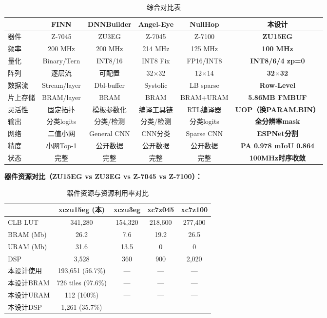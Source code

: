 \documentclass[11pt,a4paper]{article}
\begin{document}
\begin{table}[h]
\centering
\caption{综合对比表}
\small
\begin{tabular}{@{}lccccc@{}}
\toprule
 & FINN & DNNBuilder & Angel-Eye & NullHop & \textbf{本设计} \\
\midrule
器件 & Z-7045 & ZU3EG & Z-7045 & Z-7100 & \textbf{ZU15EG} \\
频率 & 200 MHz & 200 MHz & 214 MHz & 125 MHz & \textbf{100 MHz} \\
量化 & Binary/Tern & INT8/16 & INT8 Fix & FP16/INT8 & \textbf{INT8/6/4 zp=0} \\
阵列 & 逐层流 & 可配置 & 32$\times$32 & 12$\times$14 & \textbf{32$\times$32} \\
数据流 & Stream/layer & Dbl-buffer & Systolic & LB sparse & \textbf{Row-Level} \\
片上存储 & BRAM/layer & BRAM & BRAM & BRAM+URAM & \textbf{5.86MB FMBUF} \\
灵活性 & 固定拓扑 & 模板参数化 & 编译工具链 & RTL编译器 & \textbf{UOP（换PARAM.BIN）} \\
输出 & 分类logits & 分类/检测 & 分类/检测 & 分类logits & \textbf{全分辨率mask} \\
网络 & 二值小网 & General CNN & CNN分类 & Sparse CNN & \textbf{ESPNet分割} \\
精度 & 小网Top-1 & 公开数据 & 公开数据 & 公开数据 & \textbf{PA 0.978 mIoU 0.864} \\
状态 & 完整 & 完整 & 完整 & 完整 & \textbf{100MHz时序收敛} \\
\bottomrule
\end{tabular}
\end{table}

\vspace{4mm}
\textbf{器件资源对比（ZU15EG vs ZU3EG vs Z-7045 vs Z-7100）：}

\begin{table}[h]
\centering
\caption{器件资源与资源利用率对比}
\begin{tabular}{@{}lcccc@{}}
\toprule
 & xczu15eg (本) & xczu3eg & xc7z045 & xc7z100 \\
\midrule
CLB LUT & 341,280 & 154,320 & 218,600 & 277,400 \\
BRAM (Mb) & 26.2 & 7.6 & 19.2 & 26.5 \\
URAM (Mb) & 31.6 & 13.5 & 0 & 0 \\
DSP & 3,528 & 360 & 900 & 2,020 \\
\hline
本设计使用 & 193,651 (56.7\%) & — & — & — \\
本设计BRAM & 726 tiles (97.6\%) & — & — & — \\
本设计URAM & 112 (100\%) & — & — & — \\
本设计DSP & 1,261 (35.7\%) & — & — & — \\
\bottomrule
\end{tabular}
\end{table}
\end{document}
